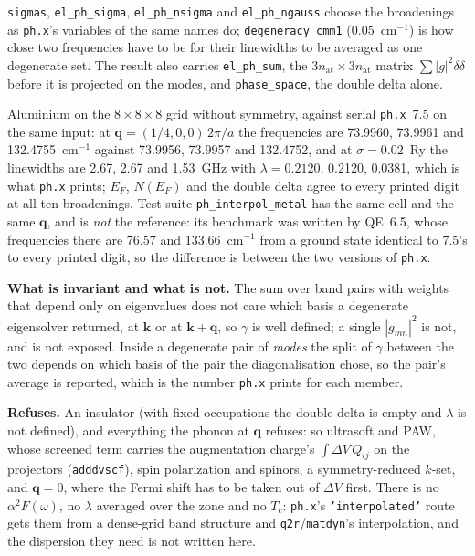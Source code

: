 \documentclass[11pt,a4paper]{article}
\newcommand{\code}[1]{\texttt{\small #1}}
\begin{document}
\noindent \code{sigmas}, \code{el\_ph\_sigma}, \code{el\_ph\_nsigma} and
\code{el\_ph\_ngauss} choose the broadenings as \code{ph.x}'s variables of the
same names do; \code{degeneracy\_cmm1} (0.05~cm$^{-1}$) is how close two
frequencies have to be for their linewidths to be averaged as one degenerate
set. The result also carries \code{el\_ph\_sum}, the
$3n_{\mathrm{at}}\times3n_{\mathrm{at}}$ matrix $\sum|g|^2\delta\delta$ before
it is projected on the modes, and \code{phase\_space}, the double delta
alone.

Aluminium on the $8\times8\times8$ grid without symmetry, against serial
\code{ph.x}~7.5 on the same input: at $\mathbf q = (1/4, 0, 0)\,2\pi/a$ the
frequencies are 73.9960, 73.9961 and 132.4755~cm$^{-1}$ against 73.9956,
73.9957 and 132.4752, and at $\sigma = 0.02$~Ry the linewidths are 2.67, 2.67
and 1.53~GHz with $\lambda = 0.2120$, 0.2120, 0.0381, which is what
\code{ph.x} prints; $E_F$, $N(E_F)$ and the double delta agree to every printed
digit at all ten broadenings. Test-suite \code{ph\_interpol\_metal} has the
same cell and the same $\mathbf q$, and is \emph{not} the reference: its
benchmark was written by QE~6.5, whose frequencies there are 76.57 and
133.66~cm$^{-1}$ from a ground state identical to 7.5's to every printed digit,
so the difference is between the two versions of \code{ph.x}.

\textbf{What is invariant and what is not.} The sum over band pairs with
weights that depend only on eigenvalues does not care which basis a degenerate
eigensolver returned, at $\mathbf k$ or at $\mathbf k+\mathbf q$, so
$\gamma$ is well defined; a single $|g_{mn}|^2$ is not, and is not exposed.
Inside a degenerate pair of \emph{modes} the split of $\gamma$ between the two
depends on which basis of the pair the diagonalisation chose, so the pair's
average is reported, which is the number \code{ph.x} prints for each member.

\begin{refuses}
\textbf{Refuses.} An insulator (with fixed occupations the double delta is
empty and $\lambda$ is not defined), and everything the phonon at $\mathbf q$
refuses: so ultrasoft and PAW, whose screened term carries the augmentation
charge's $\int\Delta V\,Q_{ij}$ on the projectors (\code{adddvscf}), spin
polarization and spinors, a symmetry-reduced $k$-set, and
$\mathbf q = 0$, where the Fermi shift has to be taken out of $\Delta V$
first. There is no $\alpha^2F(\omega)$, no $\lambda$ averaged over the zone
and no $T_c$: \code{ph.x}'s \code{'interpolated'} route gets them from a
dense-grid band structure and \code{q2r}/\code{matdyn}'s interpolation, and
the dispersion they need is not written here.
\end{refuses}
\end{document}

